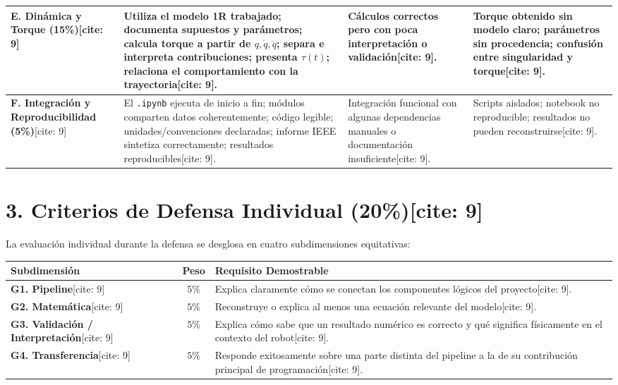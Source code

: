 \documentclass[11pt, a4paper, landscape]{article}
\begin{document}
\begin{center}
\begin{tabularx}{\textwidth}{|>{\hsize=0.7\hsize\raggedright\arraybackslash}X|>{\hsize=1.1\hsize\raggedright\arraybackslash}X|>{\hsize=1.1\hsize\raggedright\arraybackslash}X|>{\hsize=1.1\hsize\raggedright\arraybackslash}X|}
\textbf{E. Dinámica y Torque (15\%)}[cite: 9] & 
Utiliza el modelo 1R trabajado; documenta supuestos y parámetros; calcula torque a partir de $q, \dot{q}, \ddot{q}$; separa e interpreta contribuciones; presenta $\tau(t)$; relaciona el comportamiento con la trayectoria[cite: 9]. & 
Cálculos correctos pero con poca interpretación o validación[cite: 9]. & 
Torque obtenido sin modelo claro; parámetros sin procedencia; confusión entre singularidad y torque[cite: 9]. \\ \hline

\textbf{F. Integración y Reproducibilidad (5\%)}[cite: 9] & 
El \texttt{.ipynb} ejecuta de inicio a fin; módulos comparten datos coherentemente; código legible; unidades/convenciones declaradas; informe IEEE sintetiza correctamente; resultados reproducibles[cite: 9]. & 
Integración funcional con algunas dependencias manuales o documentación insuficiente[cite: 9]. & 
Scripts aislados; notebook no reproducible; resultados no pueden reconstruirse[cite: 9]. \\ \hline

\end{tabularx}
\end{center}

\newpage

\section*{3. Criterios de Defensa Individual (20\%)[cite: 9]}
La evaluación individual durante la defensa se desglosa en cuatro subdimensiones equitativas:

\begin{center}
\small
\renewcommand{\arraystretch}{1.5}
\begin{tabularx}{\textwidth}{|>{\hsize=0.45\hsize\raggedright\arraybackslash}X|c|>{\hsize=1.55\hsize\raggedright\arraybackslash}X|}
\hline
\rowcolor{gray!20} \textbf{Subdimensión} & \textbf{Peso} & \textbf{Requisito Demostrable} \\ \hline
\textbf{G1. Pipeline}[cite: 9] & $5\%$ & Explica claramente cómo se conectan los componentes lógicos del proyecto[cite: 9]. \\ \hline
\textbf{G2. Matemática}[cite: 9] & $5\%$ & Reconstruye o explica al menos una ecuación relevante del modelo[cite: 9]. \\ \hline
\textbf{G3. Validación / Interpretación}[cite: 9] & $5\%$ & Explica cómo sabe que un resultado numérico es correcto y qué significa físicamente en el contexto del robot[cite: 9]. \\ \hline
\textbf{G4. Transferencia}[cite: 9] & $5\%$ & Responde exitosamente sobre una parte distinta del pipeline a la de su contribución principal de programación[cite: 9]. \\ \hline
\end{tabularx}
\end{center}
\end{document}
